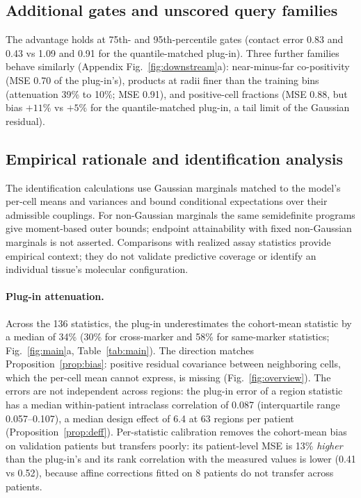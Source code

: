 \documentclass[10pt,letterpaper]{article}
\theoremstyle{definition}
\theoremstyle{remark}
\begin{document}
\subsection{Additional gates and unscored query families}
\label{app:families}
The advantage holds at 75th- and 95th-percentile gates (contact error 0.83 and 0.43 vs 1.09 and 0.91 for the quantile-matched plug-in). Three further families behave similarly (Appendix Fig.~\ref{fig:downstream}a): near-minus-far co-positivity (MSE 0.70 of the plug-in's), products at radii finer than the training bins (attenuation 39\% to 10\%; MSE 0.91), and positive-cell fractions (MSE 0.88, but bias $+11\%$ vs $+5\%$ for the quantile-matched plug-in, a tail limit of the Gaussian residual).

\subsection{Empirical rationale and identification analysis}
\label{app:diagnostics}
The identification calculations use Gaussian marginals matched to the model's per-cell means and variances and bound conditional expectations over their admissible couplings. For non-Gaussian marginals the same semidefinite programs give moment-based outer bounds; endpoint attainability with fixed non-Gaussian marginals is not asserted. Comparisons with realized assay statistics provide empirical context; they do not validate predictive coverage or identify an individual tissue's molecular configuration.

\paragraph{Plug-in attenuation.}
Across the 136 statistics, the plug-in underestimates the cohort-mean statistic by a median of 34\% (30\% for cross-marker and 58\% for same-marker statistics; Fig.~\ref{fig:main}a, Table~\ref{tab:main}). The direction matches Proposition~\ref{prop:bias}: positive residual covariance between neighboring cells, which the per-cell mean cannot express, is missing (Fig.~\ref{fig:overview}). The errors are not independent across regions: the plug-in error of a region statistic has a median within-patient intraclass correlation of 0.087 (interquartile range 0.057--0.107), a median design effect of 6.4 at 63 regions per patient (Proposition~\ref{prop:deff}). Per-statistic calibration removes the cohort-mean bias on validation patients but transfers poorly: its patient-level MSE is 13\% \emph{higher} than the plug-in's and its rank correlation with the measured values is lower (0.41 vs 0.52), because affine corrections fitted on 8 patients do not transfer across patients.
\end{document}
